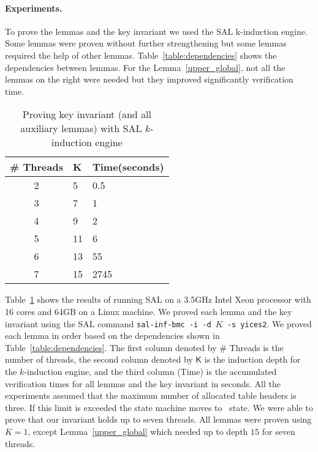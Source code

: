 \paragraph{Experiments.} To prove the lemmas and the key invariant we used the SAL
k-induction engine. Some lemmas were proven without further
strengthening but some lemmas required the help of other
lemmas. Table~\ref{table:dependencies} shows the dependencies between
lemmas. For the Lemma~\ref{upper_global}, not all the lemmas on the
right were needed but they improved significantly verification time.

\begin{table}[t]
  \begin{center}
    \begin{tabular}{|c|l|l|}
      \hline
      \textsf{\# Threads} & \textsf{K} & \textsf{Time(seconds)} \\
      \hline
      \hline           
      2 & 5  & 0.5\\
      \hline           
      3 & 7  & 1 \\
      \hline           
      4 & 9  & 2\\
      \hline           
      5 & 11 & 6 \\
      \hline           
      6 & 13 & 55 \\
      \hline           
      7 & 15 & 2745 \\      
      \hline 
    \end{tabular}
    \caption{Proving key invariant (and all auxiliary lemmas) with SAL $k$-induction engine}
    \label{sal-results}
    \end{center}
\end{table}


Table~\ref{sal-results} shows the results of running SAL on a 3.5GHz
Intel Xeon processor with 16 cores and 64GB on a Linux machine. We
proved each lemma and the key invariant using the SAL command
\texttt{sal-inf-bmc -i -d $K$ -s yices2}. We proved each lemma in
order based on the dependencies shown in
Table~\ref{table:dependencies}.
%
The first column denoted by \textsf{\# Threads} is the number of
threads, the second column denoted by $\mathsf{K}$ is the induction
depth for the $k$-induction engine, and the third column
(\textsf{Time}) is the accumulated verification times for all lemmas
and the key invariant in seconds. All the experiments assumed that the
maximum number of allocated table headers is three. If this limit is exceeded
the state machine moves to \pcthree\ state.
%
We were able to prove that our invariant holds up to seven
threads. All lemmas were proven using $K=1$, except
Lemma~\ref{upper_global} which needed up to depth $15$ for seven
threads.
%




